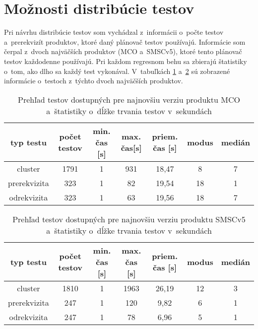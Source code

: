 \section{Možnosti distribúcie testov}
\label{sekcia:moznosti_distribucie}
Pri návrhu distribúcie testov som vychádzal z~informácii o~počte 
testov a~prerekvizít produktov, ktoré daný plánovač testov používajú. 
Informácie som čerpal z~dvoch najväčších produktov (MCO a~SMSCv5), 
ktoré tento plánovač testov každodenne používajú. 
Pri každom regresnom behu sa zbierajú štatistiky o~tom,
ako dlho sa každý test vykonával. 
V~tabuľkách \ref{tabulka:testy_mco} a~\ref{tabulka:testy_smsc} sú 
zobrazené informácie o~testoch z~týchto dvoch najväčších produktov.

\begin{table}
  \begin{center}
    \begin{tabular}{| c | c | c | c | c | c | c |}
    \hline
    typ testu & počet testov & min. čas [s] & max. čas[s] & 
    priem. čas [s] & modus & medián \\ \hline
    cluster      & 1791 & 1 & 931 & 18,47 & 8  & 7 \\ \hline
    prerekvizita & 323  & 1 & 82  & 19,54 & 18 & 1 \\ \hline
    odrekvizita  & 323  & 1 & 63  & 19,56 & 18 & 7 \\
    \hline
    \end{tabular}
    \caption{Prehľad testov dostupných pre najnovšiu verziu produktu MCO 
             a~štatistiky o~dĺžke trvania testov v~sekundách}
    \label{tabulka:testy_mco}
  \end{center}
\end{table}

\begin{table}
  \begin{center}
    \begin{tabular}{| c | c | c | c | c | c | c |}
    \hline
    typ testu & počet testov & min. čas [s] & max. čas [s] & 
    priem. čas [s] & modus & medián \\ \hline
    cluster      & 1810 & 1 & 1963 & 26,19 & 12 & 3 \\ \hline
    prerekvizita & 247  & 1 & 120  & 9,82  & 6  & 1 \\ \hline
    odrekvizita  & 247  & 1 & 78   & 6,96  & 5  & 1 \\
    \hline
    \end{tabular}
    \caption{Prehľad testov dostupných pre najnovšiu verziu produktu SMSCv5 
             a~štatistiky o~dĺžke trvania testov v~sekundách}
    \label{tabulka:testy_smsc}
  \end{center}
\end{table}

